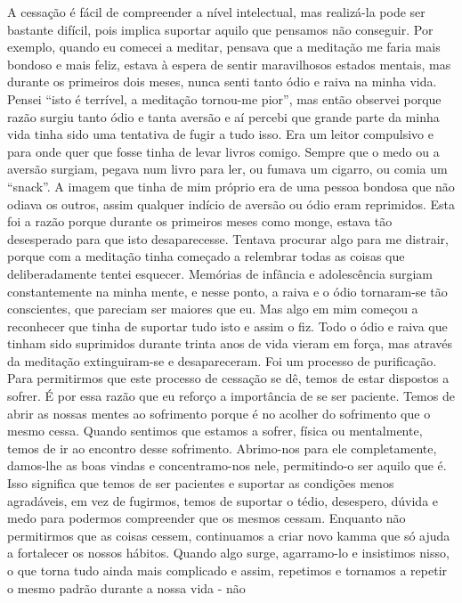 A cessação é fácil de compreender a nível intelectual,
mas realizá-la pode ser bastante difícil, pois implica suportar
aquilo que pensamos não conseguir. Por exemplo, quando eu
comecei a meditar, pensava que a meditação me faria mais
bondoso e mais feliz, estava à espera de sentir maravilhosos
estados mentais, mas durante os primeiros dois meses, nunca
senti tanto ódio e raiva na minha vida. Pensei “isto é terrível,
a meditação tornou-me pior”, mas então observei porque
razão surgiu tanto ódio e tanta aversão e aí percebi que grande
parte da minha vida tinha sido uma tentativa de fugir a tudo
isso. Era um leitor compulsivo e para onde quer que fosse
tinha de levar livros comigo. Sempre que o medo ou a aversão
surgiam, pegava num livro para ler, ou fumava um cigarro, ou
comia um “snack”. A imagem que tinha de mim próprio era
de uma pessoa bondosa que não odiava os outros, assim qualquer indício de aversão ou ódio eram reprimidos.
Esta foi a razão porque durante os primeiros meses como
monge, estava tão desesperado para que isto desaparecesse.
Tentava procurar algo para me distrair, porque com a meditação tinha começado a relembrar todas as coisas que deliberadamente tentei esquecer. Memórias de infância e adolescência
surgiam constantemente na minha mente, e nesse ponto, a
raiva e o ódio tornaram-se tão conscientes, que pareciam ser
maiores que eu. Mas algo em mim começou a reconhecer que
tinha de suportar tudo isto e assim o fiz. Todo o ódio e raiva
que tinham sido suprimidos durante trinta anos de vida vieram
em força, mas através da meditação extinguiram-se e desapareceram. Foi um processo de purificação.
Para permitirmos que este processo de cessação se dê,
temos de estar dispostos a sofrer. É por essa razão que eu
reforço a importância de se ser paciente. Temos de abrir as
nossas mentes ao sofrimento porque é no acolher do sofrimento 
que o mesmo cessa. Quando sentimos que estamos a
sofrer, física ou mentalmente, temos de ir ao encontro desse
sofrimento. Abrimo-nos para ele completamente, damos-lhe
as boas vindas e concentramo-nos nele, permitindo-o ser
aquilo que é. Isso significa que temos de ser pacientes e
suportar as condições menos agradáveis, em vez de fugirmos,
temos de suportar o tédio, desespero, dúvida e medo para
podermos compreender que os mesmos cessam.
Enquanto não permitirmos que as coisas cessem, continuamos a criar novo kamma que só ajuda a fortalecer os nossos
hábitos. Quando algo surge, agarramo-lo e insistimos nisso, o
que torna tudo ainda mais complicado e assim, repetimos e
tornamos a repetir o mesmo padrão durante a nossa vida - não
